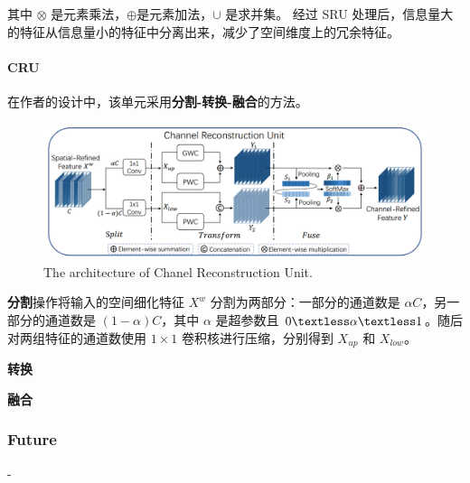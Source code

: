 \documentclass[a4paper, 10pt]{article}
\begin{document}
		其中 $\otimes$ 是元素乘法，$\oplus$是元素加法，$\cup$ 是求并集。
		经过 SRU 处理后，信息量大的特征从信息量小的特征中分离出来，减少了空间维度上的冗余特征。
		\paragraph{CRU}
		
		在作者的设计中，该单元采用\textbf{分割-转换-融合}的方法。
		
		\begin{figure}[htbp]
			\centering 
			\includegraphics[width=\columnwidth]{picture/LLIE/SCConv/Chanel Reconstruction Unit}
			\caption{
				\label{fig: Chanel Reconstruction Unit} 
				The architecture of Chanel Reconstruction Unit.
			}
		\end{figure}
		
		\textbf{分割}操作将输入的空间细化特征 $X^{w}$ 分割为两部分：一部分的通道数是 $\alpha C$，另一部分的通道数是 $(1-\alpha) C$，其中 $\alpha$ 是超参数且 $0 \textless \alpha \textless 1$。随后对两组特征的通道数使用 $1 \times 1$ 卷积核进行压缩，分别得到 $X_{up}$ 和 $X_{low}$。
		
		\textbf{转换}
		
		\textbf{融合}
		
		\subsubsection{Future}
		
		-
		
		\renewcommand{\refname}{References}
		
		
			
			
\end{document}
